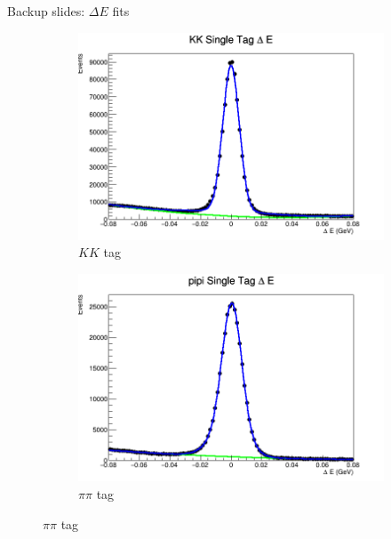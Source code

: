 \documentclass{beamer}
\begin{document}
\begin{frame}{Backup slides: $\Delta E$ fits}
  \begin{figure}
    \centering
    \vspace{-0.2cm}
    \begin{subfigure}{0.5\textwidth}
      \includegraphics[width = 1\textwidth]{KKDeltaE.png}
      \caption{$KK$ tag}
    \end{subfigure}%
    \begin{subfigure}{0.5\textwidth}
      \includegraphics[width = 1\textwidth]{pipiDeltaE.png}
      \caption{$\pi\pi$ tag}
    \end{subfigure}
  \end{figure}
\end{frame}
\end{document}
